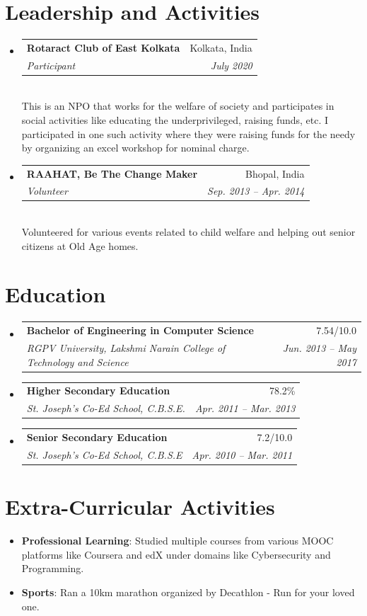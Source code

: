 \documentclass[letterpaper,11pt]{article}
\makeatletter
\newcommand{\resumeSubheading}[4]{
  \vspace{-2pt}\item
    \begin{tabular*}{0.97\textwidth}[t]{l@{\extracolsep{\fill}}r}
      \textbf{#1} & #2 \\
      \textit{\small#3} & \textit{\small #4} \\
    \end{tabular*}\vspace{-7pt}
}
\newcommand{\resumeSubHeadingListStart}{\begin{itemize}[leftmargin=0.15in, label={}]}
\newcommand{\resumeSubHeadingListEnd}{\end{itemize}}
\makeatother
\begin{document}
\section{Leadership and Activities}
 \resumeSubHeadingListStart
  \resumeSubheading
     {Rotaract Club of East Kolkata}{Kolkata, India}
     {Participant}{July 2020} \vspace{2px} \\
     {This is an NPO that works for the welfare of society and participates in social activities like educating the underprivileged, raising funds, etc. I participated in one such activity where they were raising funds for the needy by organizing an excel workshop for nominal charge.}
  \resumeSubheading
     {RAAHAT, Be The Change Maker}{Bhopal, India}
     {Volunteer}{Sep. 2013 -- Apr. 2014} \vspace{2px} \\
     {Volunteered for various events related to child welfare and helping out senior citizens at Old Age homes.}
 \resumeSubHeadingListEnd

\section{Education}
  \resumeSubHeadingListStart
    \resumeSubheading
      {Bachelor of Engineering in Computer Science}{7.54/10.0}
      {RGPV University, Lakshmi Narain College of Technology and Science}{Jun. 2013 -- May 2017}
    \resumeSubheading
      {Higher Secondary Education}{78.2\%}
      {St. Joseph's Co-Ed School, C.B.S.E.}{Apr. 2011 -- Mar. 2013}
    \resumeSubheading
      {Senior Secondary Education}{7.2/10.0}
      {St. Joseph's Co-Ed School, C.B.S.E}{Apr. 2010 -- Mar. 2011}
  \resumeSubHeadingListEnd

\section{Extra-Curricular Activities}
 \begin{itemize}
     \item { \textbf {Professional Learning}{: Studied multiple courses from various MOOC platforms like Coursera and edX under domains like Cybersecurity and Programming.}}
     \item {\textbf {Sports}{: Ran a 10km marathon organized by Decathlon - Run for your loved one.}}
 \end{itemize}

\end{document}
